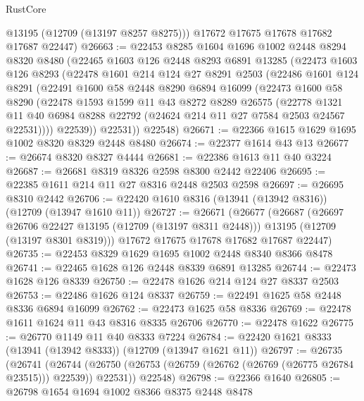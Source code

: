 \begin{lexlean}{RustCore}
\begin{coremodule}
        @13195
        (@12709 (@13197 @8257 @8275)))
      @17672
      @17675
      @17678
      @17682
      @17687
      @22447)
@26663 := @22453
    @8285
    @1604
    @1696
    @1002
    @2448
    @8294
    @8320
    @8480
    (@22465
      @1603
      @126
      @2448
      @8293
      @6891
      @13285
      (@22473
        @1603
        @126
        @8293
        (@22478
          @1601
          @214
          @124
          @27
          @8291
          @2503
          (@22486
            @1601
            @124
            @8291
            (@22491
              @1600
              @58
              @2448
              @8290
              @6894
              @16099
              (@22473
                @1600
                @58
                @8290
                (@22478
                  @1593
                  @1599
                  @11
                  @43
                  @8272
                  @8289
                  @26575
                  (@22778
                    @1321
                    @11
                    @40
                    @6984
                    @8288
                    @22792
                    (@24624 @214 @11 @27 @7584 @2503 @24567 @22531))))
              @22539))
          @22531))
      @22548)
@26671 := @22366 @1615 @1629 @1695 @1002 @8320 @8329 @2448 @8480
@26674 := @22377 @1614 @43 @13
@26677 := @26674 @8320 @8327 @4444
@26681 := @22386 @1613 @11 @40 @3224
@26687 := @26681 @8319 @8326 @2598 @8300 @2442 @22406
@26695 := @22385 @1611 @214 @11 @27 @8316 @2448 @2503 @2598
@26697 := @26695 @8310 @2442
@26706 := @22420 @1610 @8316 (@13941 (@13942 @8316)) (@12709 (@13947 @1610 @11))
@26727 := @26671
    (@26677
      (@26687
        (@26697 @26706 @22427 @13195 (@12709 (@13197 @8311 @2448)))
        @13195
        (@12709 (@13197 @8301 @8319)))
      @17672
      @17675
      @17678
      @17682
      @17687
      @22447)
@26735 := @22453 @8329 @1629 @1695 @1002 @2448 @8340 @8366 @8478
@26741 := @22465 @1628 @126 @2448 @8339 @6891 @13285
@26744 := @22473 @1628 @126 @8339
@26750 := @22478 @1626 @214 @124 @27 @8337 @2503
@26753 := @22486 @1626 @124 @8337
@26759 := @22491 @1625 @58 @2448 @8336 @6894 @16099
@26762 := @22473 @1625 @58 @8336
@26769 := @22478 @1611 @1624 @11 @43 @8316 @8335 @26706
@26770 := @22478 @1622
@26775 := @26770 @1149 @11 @40 @8333 @7224
@26784 := @22420 @1621 @8333 (@13941 (@13942 @8333)) (@12709 (@13947 @1621 @11))
@26797 := @26735
    (@26741
      (@26744 (@26750 (@26753 (@26759 (@26762 (@26769 (@26775 @26784 @23515))) @22539)) @22531))
      @22548)
@26798 := @22366 @1640
@26805 := @26798 @1654 @1694 @1002 @8366 @8375 @2448 @8478

\end{coremodule}
\end{lexlean}
